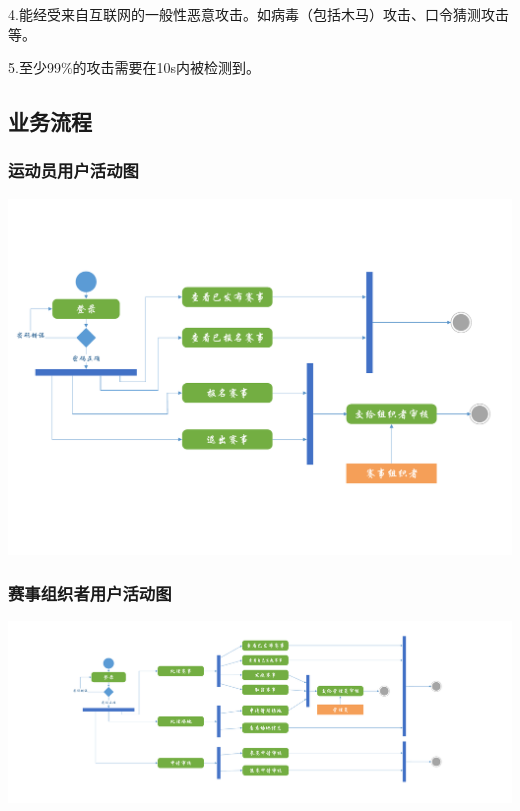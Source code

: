 \documentclass[a4paper,UTF8]{article}
\begin{document}
4.能经受来自互联网的一般性恶意攻击。如病毒（包括木马）攻击、口令猜测攻击等。

5.至少99\%的攻击需要在10s内被检测到。


\subsection{业务流程}
\subsubsection{运动员用户活动图}
{\centering\includegraphics[width=1\columnwidth]{ac1}
	
}

\subsubsection{赛事组织者用户活动图}
{\centering\includegraphics[width=1\columnwidth]{ac2}
	
}
\end{document}
